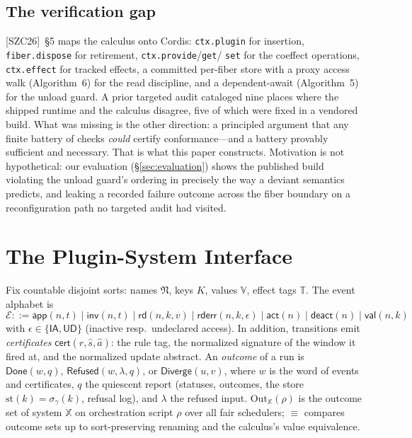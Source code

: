 \documentclass[sigplan,screen,review,nonacm]{acmart}
\newcommand{\Out}{\mathrm{Out}}
\newcommand{\SZC}{[SZC26]}
\begin{document}
\subsection{The verification gap}\label{sec:gap}

\SZC{}~\S5 maps the calculus onto Cordis: \texttt{ctx.plugin} for insertion,
\texttt{fiber.dispose} for retirement, \texttt{ctx.provide}/\texttt{get}/%
\texttt{set} for the coeffect operations, \texttt{ctx.effect} for tracked
effects, a committed per-fiber store with a proxy access walk (Algorithm~6) for
the read discipline, and a dependent-await (Algorithm~5) for the unload guard.
A prior targeted audit cataloged nine places where the shipped runtime and the
calculus disagree, five of which were fixed in a vendored build. What was
missing is the other direction: a principled argument that any finite battery of
checks \emph{could} certify conformance---and a battery provably sufficient and
necessary. That is what this paper constructs. Motivation is not hypothetical:
our evaluation (\S\ref{sec:evaluation}) shows the published build violating the
unload guard's ordering in precisely the way a deviant semantics predicts, and
leaking a recorded failure outcome across the fiber boundary on a
reconfiguration path no targeted audit had visited.

\section{The Plugin-System Interface}\label{sec:interface}

\begin{definition}\label{def:events}
Fix countable disjoint sorts: names $\mathfrak N$, keys $K$, values
$\mathbb V$, effect tags $\mathbb T$. The event alphabet is
\[
\mathcal E ::= \mathsf{app}(n,t) \mid \mathsf{inv}(n,t) \mid \mathsf{rd}(n,k,v)
\mid \mathsf{rderr}(n,k,\epsilon) \mid \mathsf{act}(n) \mid \mathsf{deact}(n)
\mid \mathsf{val}(n,k)
\]
with $\epsilon \in \{\mathsf{IA}, \mathsf{UD}\}$ (inactive resp.\ undeclared
access). In addition, transitions emit \emph{certificates}
$\mathsf{cert}(r, \widehat s, \widehat a)$: the rule tag, the normalized
signature of the window it fired at, and the normalized update abstract. An
\emph{outcome} of a run is $\mathsf{Done}(w,q)$, $\mathsf{Refused}(w,\lambda,q)$,
or $\mathsf{Diverge}(u,v)$, where $w$ is the word of events and certificates,
$q$ the quiescent report (statuses, outcomes, the store
$\mathrm{st}(k) = \sigma_\gamma(k)$, refusal log), and $\lambda$ the refused
input. $\Out_{\mathbb X}(\rho)$ is the outcome set of system $\mathbb X$ on
orchestration script $\rho$ over all fair schedulers; $\equiv$ compares outcome
sets up to sort-preserving renaming and the calculus's value equivalence.
\end{definition}
\end{document}
